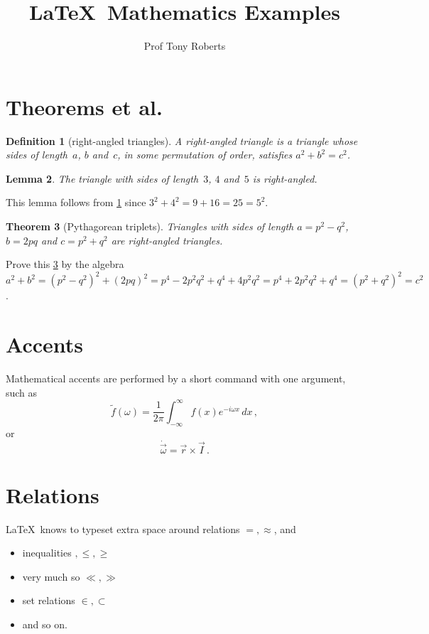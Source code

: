 \documentclass[20pt,a4paper]{extarticle}
\title{\LaTeX\ Mathematics Examples}
\author{Prof Tony Roberts}
\newtheorem{theorem}{Theorem}
\newtheorem{lemma}[theorem]{Lemma}
\newtheorem{definition}[theorem]{Definition}
\begin{document}
\maketitle

\tableofcontents



\section{Theorems et al.}


\begin{definition}[right-angled triangles] \label{def:tri}
A \emph{right-angled triangle} is a triangle whose sides of length~\(a\), \(b\) and~\(c\), in some permutation of order, satisfies \(a^2+b^2=c^2\).
\end{definition}

\begin{lemma} 
The triangle with sides of length~\(3\), \(4\) and~\(5\) is right-angled.
\end{lemma}

This lemma follows from \cref{def:tri} since \(3^2+4^2=9+16=25=5^2\).

\begin{theorem}[Pythagorean triplets] \label{thm:py}
Triangles with sides of length \(a=p^2-q^2\), \(b=2pq\) and \(c=p^2+q^2\) are right-angled triangles.
\end{theorem}

Prove this \cref{thm:py} by the algebra \(a^2+b^2 =(p^2-q^2)^2+(2pq)^2
=p^4-2p^2q^2+q^4+4p^2q^2
=p^4+2p^2q^2+q^4
=(p^2+q^2)^2 =c^2\).




\section{Accents}

Mathematical accents are performed by a short command with one 
argument, such as
\[
	\tilde f(\omega)=\frac{1}{2\pi}
	\int_{-\infty}^\infty f(x)e^{-i\omega x}\,dx\,,
\]
or
\[
	\dot{\vec \omega}=\vec r\times\vec I\,.
\]



\section{Relations}
\LaTeX\ knows to typeset extra space around relations
\(=, \approx\), and 
\begin{itemize}
\item inequalities \(< , > , \leq , \geq \)
\item very much so \(\ll , \gg \) 
\item set relations \(\in , \subset\)
\item and so on.
\end{itemize}
\end{document}
